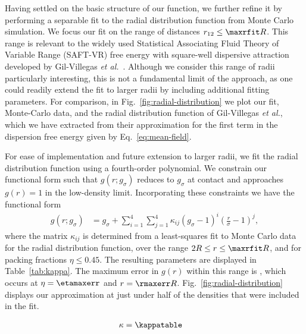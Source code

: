 \documentclass[letterpaper,twocolumn,amsmath,amssymb,pre,aps,10pt]{revtex4-1}
\begin{document}
Having settled on the basic structure of our function, we further
refine it by performing a separable fit to the radial distribution
function from Monte Carlo simulation.  We focus our fit on
the range of distances $r_{12} \le \maxrfit R$.  This range is
relevant to the widely used \cite{chapman1989saft,
  muller2001molecular, tan2008recent} Statistical
Associating Fluid Theory of Variable Range (SAFT-VR) free energy with
square-well dispersive attraction developed by Gil-Villegas \emph{et
  al.}~\cite{gil1997statistical}.
%
Although we consider this range of radii particularly interesting,
this is not a fundamental limit of the approach, as one could readily
extend the fit to larger radii by including additional fitting
parameters.
%
For comparison, in Fig.~\ref{fig:radial-distribution} we plot our fit,
Monte-Carlo data, and the radial distribution function of Gil-Villegas
\emph{et al.}, which we have extracted from their approximation for
the first term in the dispersion free energy given by
Eq.~\ref{eq:mean-field}.

For ease of implementation and future extension to larger radii, we
fit the radial distribution function using a fourth-order polynomial.  We constrain
our functional form such that $g(r; g_\sigma)$ reduces to $g_\sigma$
at contact and approaches $g(r)=1$ in the low-density limit.
Incorporating these constraints we have the functional form
\begin{align}
  g(r;g_\sigma) &=
  g_\sigma + \sum_{i=1}^{4} \sum_{j=1}^{4} \kappa_{ij} (g_\sigma - 1)^i
  \left(\tfrac{r}{\sigma}-1\right)^j,
  \label{eq:fit-form}
\end{align}
where the matrix $\kappa_{ij}$ is determined from a least-squares
fit to Monte Carlo data for the radial distribution function, over the
range $2R \le r \le \maxrfit R$, and for packing fractions $\eta \le
0.45$.  The resulting parameters are displayed in
Table~\ref{tab:kappa}.  The maximum error in $g(r)$ within this
range is \maxerr, which occurs at $\eta = \etamaxerr$ and $r =
\rmaxerr R$.  Fig.~\ref{fig:radial-distribution} displays
our approximation at just under half of the densities that were
included in the fit.

\begin{table}
  \begin{align*}
    \kappa &= \kappatable
  \end{align*}
  \caption{The fitted $\kappa_{ij}$ matrix.
  }\label{tab:kappa}
\end{table}
\end{document}

